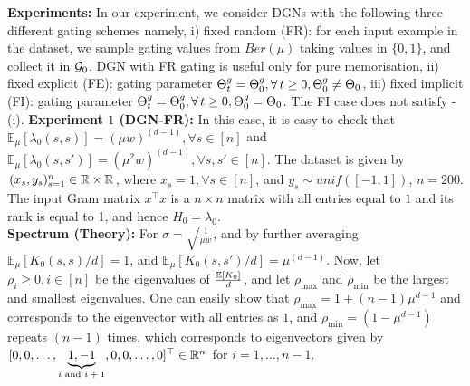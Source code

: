 \textbf{Experiments:} In our experiment, we consider DGNs with the following three different gating schemes namely, i) fixed random (FR): for each input example in the dataset, we sample gating values from $Ber(\mu)$ taking values in $\{0,1\}$, and collect it in $\mathcal{G}_0$. DGN with FR gating is useful only for pure memorisation, ii) fixed explicit (FE): gating parameter ${\Theta}^g_t={\Theta}^g_0,\forall\, t\geq 0, {\Theta}^g_0\neq \Theta_0$, iii) fixed implicit (FI): gating parameter ${\Theta}^g_t={\Theta}^g_0,\forall\, t\geq 0, {\Theta}^g_0= \Theta_0$. The FI case does not satisfy -(i).
\textbf{Experiment $1$ (DGN-FR):}  In this case, it is easy to check that $\mathbb{E}_{\mu}\left[\lambda_0(s,s)\right]=(\mu w)^{(d-1)},\forall s\in[n]$ and $\mathbb{E}_{\mu}\left[\lambda_0(s,s')\right]=(\mu^2 w)^{(d-1)},\forall s,s'\in[n]$. The
dataset is given by $(x_s,y_s)_{s=1}^n\in \mathbb{R}\times \mathbb{R}$, where $x_s=1,\forall s\in [n]$, and $y_s\sim unif([-1,1])$, $n=200$. The input Gram matrix $x^\top x$ is a $n\times n$ matrix with all entries equal to $1$ and its rank is equal to 1, and hence $H_0=\lambda_0$.\\
\textbf{Spectrum (Theory):} For $\sigma=\sqrt{\frac{1}{\mu w}}$, and by further averaging $\mathbb{E}_{\mu}\left[K_0(s,s)/d\right]=1$, and $\mathbb{E}_{\mu}\left[K_0(s,s')/d\right]=\mu^{(d-1)}$. Now, let $\rho_i\geq 0,i \in [n]$ be the eigenvalues of $\frac{\mathbb{E}\left[K_0\right]}{d}$, and let $\rho_{\max}$ and $\rho_{\min}$ be the largest and smallest eigenvalues. \WFclear One can easily show that $\rho_{\max}=1+(n-1)\mu^{d-1}$ and corresponds to the eigenvector with all entries as $1$, and $\rho_{\min}=(1-\mu^{d-1})$ repeats $(n-1)$ times, which corresponds to eigenvectors given by $[0, 0, \ldots, \underbrace{1, -1}_{\text{$i$ and $i+1$}}, 0,0,\ldots, 0]^\top \in \mathbb{R}^n$ for $i=1,\ldots,n-1$.\\
